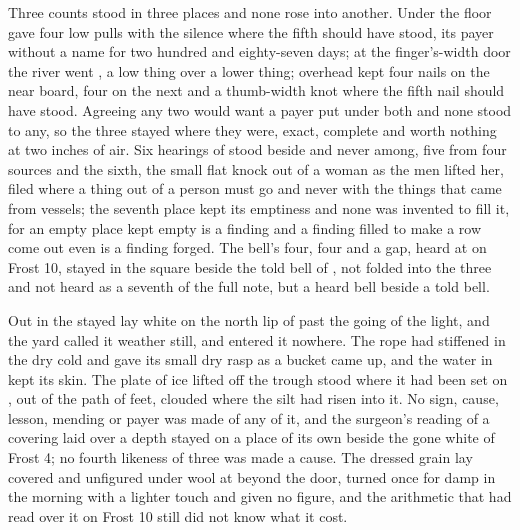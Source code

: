Three counts stood in three places and none rose into another. Under the floor  gave four low pulls with the silence where the fifth should have stood, its payer without a name for two hundred and eighty-seven days; at the finger's-width door the river went , a low thing over a lower thing; overhead  kept four nails on the near board, four on the next and a thumb-width knot where the fifth nail should have stood. Agreeing any two would want a payer put under both and none stood to any, so the three stayed where they were, exact, complete and worth nothing at two inches of air. Six hearings of  stood beside and never among, five from four sources and the sixth, the small flat knock out of a woman as the men lifted her, filed where a thing out of a person must go and never with the things that came from vessels; the seventh place kept its emptiness and none was invented to fill it, for an empty place kept empty is a finding and a finding filled to make a row come out even is a finding forged. The bell's four, four and a gap, heard at  on Frost 10, stayed in the square beside the told bell of , not folded into the three and not heard as a seventh of the full note, but a heard bell beside a told bell.

\scenebreak

Out in  the stayed  lay white on the north lip of  past the going of the light, and the yard called it weather still, and entered it nowhere. The rope had stiffened in the dry cold and gave its small dry rasp as a bucket came up, and the water in  kept its skin. The plate of ice lifted off the trough stood where it had been set on , out of the path of feet, clouded where the silt had risen into it. No sign, cause, lesson, mending or payer was made of any of it, and the surgeon's reading of a covering laid over a depth stayed on a place of its own beside the gone white of Frost 4; no fourth likeness of three was made a cause. The dressed grain lay covered and unfigured under wool at  beyond the door, turned once for damp in the morning with a lighter touch and given no figure, and the arithmetic that had read over it on Frost 10 still did not know what it cost.

\scenebreak

